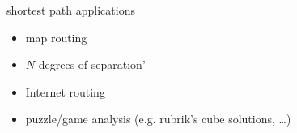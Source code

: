 \begin{frame}{shortest path applications}
\begin{itemize}
\item map routing
\item $N$ degrees of separation'
\item Internet routing
\item puzzle/game analysis (e.g. rubrik's cube solutions, \ldots)
\end{itemize}
\end{frame}
